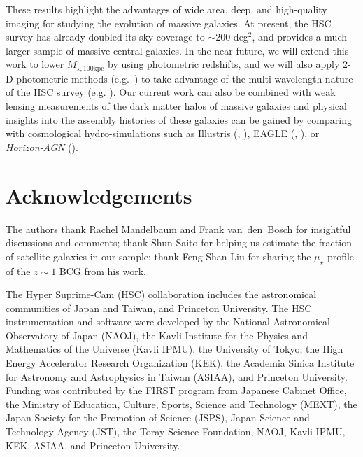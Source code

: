 \documentclass[a4paper,fleqn,usenatbib]{mnras}
\def\mtot{{$M_{\star,100\mathrm{kpc}}$}}
\def\mden{{$\mu_{\star}$}}
\begin{document}
    These results highlight the advantages of wide area, deep, and high-quality imaging 
    for studying the evolution of massive galaxies. 
    At present, the HSC survey has already doubled its sky coverage to 
    ${\sim} 200$ deg$^2$, and provides a much larger sample of massive central galaxies. 
    In the near future, we will extend this work to lower \mtot{} by using photometric 
    redshifts, and we will also apply 2-D photometric methods (e.g.\ \citealt{Huang2013a}) 
    to take advantage of the multi-wavelength nature of the HSC survey 
    (e.g. \citealt{Huang2016}). 
    Our current work can also be combined with weak lensing measurements of the dark 
    matter halos of massive galaxies and physical insights into the assembly histories 
    of these galaxies can be gained by comparing with cosmological hydro-simulations 
    such as Illustris (\citealt{Vogelsberger2014}, \citealt{Genel2014}), 
    EAGLE (\citealt{Schaye2015}, \citealt{Crain2015}), or \textit{Horizon-AGN} 
    (\citealt{Dubois2014}).

  
\section*{Acknowledgements}

  The authors thank Rachel Mandelbaum and Frank van~den~Bosch for insightful 
  discussions and comments; 
  thank Shun Saito for helping us estimate the fraction of satellite 
  galaxies in our sample;
  thank Feng-Shan Liu for sharing the \mden{} profile of the $z\sim1$ BCG from 
  his work.

  The Hyper Suprime-Cam (HSC) collaboration includes the astronomical communities of 
  Japan and Taiwan, and Princeton University.  The HSC instrumentation and software were
  developed by the National Astronomical Observatory of Japan (NAOJ), the Kavli Institute
  for the Physics and Mathematics of the Universe (Kavli IPMU), the University of Tokyo,
  the High Energy Accelerator Research Organization (KEK), the Academia Sinica Institute
  for Astronomy and Astrophysics in Taiwan (ASIAA), and Princeton University.  
  Funding was contributed by the FIRST program from Japanese Cabinet Office, the Ministry 
  of Education, Culture, Sports, Science and Technology (MEXT), the Japan Society for 
  the Promotion of Science (JSPS), Japan Science and Technology Agency (JST), the
  Toray Science Foundation, NAOJ, Kavli IPMU, KEK, ASIAA, and Princeton University.
   
\end{document}
